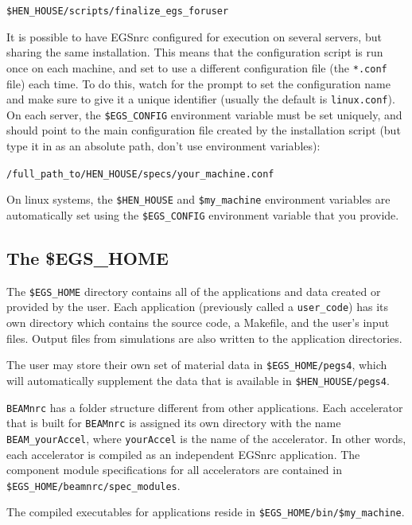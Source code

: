 \documentclass[12pt,twoside]{article}
\begin{document}
\Verb+$HEN_HOUSE/scripts/finalize_egs_foruser+

It is possible to have EGSnrc configured for execution on several servers, but sharing the same installation. This means that the configuration script is run once on each machine, and set to use a different configuration file (the \Verb+*.conf+ file) each time. To do this, watch for the prompt to set the configuration name and make sure to give it a unique identifier (usually the default is \Verb+linux.conf+). On each server, the \Verb+$EGS_CONFIG+ environment variable must be set uniquely, and should point to the main configuration file created by the installation script (but type it in as an absolute path, don't use environment variables):

\Verb+/full_path_to/HEN_HOUSE/specs/your_machine.conf+

On linux systems, the \Verb+$HEN_HOUSE+ and \Verb+$my_machine+ environment variables are automatically set using the \Verb+$EGS_CONFIG+ environment variable that you provide.

\subsection{The \$EGS\_HOME}
The \Verb+$EGS_HOME+ directory contains all of the applications and data created or provided by the user. Each application (previously called a \Verb+user_code+) has its own directory which contains the source code, a Makefile, and the user's input files. Output files from simulations are also written to the application directories.

The user may store their own set of material data in \Verb+$EGS_HOME/pegs4+, which will automatically supplement the data that is available in \Verb+$HEN_HOUSE/pegs4+.

\Verb+BEAMnrc+ has a folder structure different from other applications. Each accelerator that is built for \Verb+BEAMnrc+ is assigned its own directory with the name \Verb+BEAM_yourAccel+, where \Verb+yourAccel+ is the name of the accelerator. In other words, each accelerator is compiled as an independent EGSnrc application. The component module specifications for all accelerators are contained in \Verb+$EGS_HOME/beamnrc/spec_modules+.

The compiled executables for applications reside in \Verb+$EGS_HOME/bin/$my_machine+.
\end{document}
